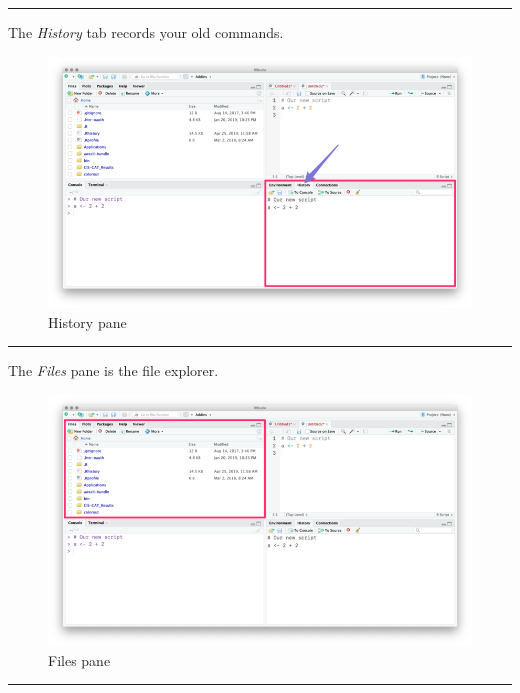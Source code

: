 \documentclass[]{book}
\begin{document}
\begin{center}\rule{0.5\linewidth}{\linethickness}\end{center}

The \emph{History} tab records your old commands.

\begin{figure}
\centering
\includegraphics{img/rstudio_history.png}
\caption{History pane}
\end{figure}

\begin{center}\rule{0.5\linewidth}{\linethickness}\end{center}

The \emph{Files} pane is the file explorer.

\begin{figure}
\centering
\includegraphics{img/rstudio_files.png}
\caption{Files pane}
\end{figure}

\begin{center}\rule{0.5\linewidth}{\linethickness}\end{center}
\end{document}
